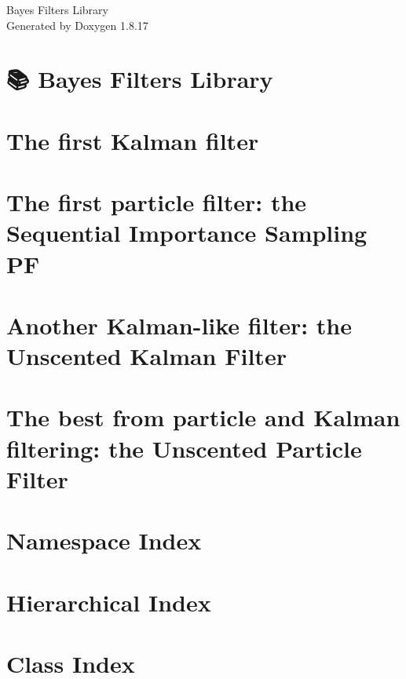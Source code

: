 \let\mypdfximage\pdfximage\def\pdfximage{\immediate\mypdfximage}\documentclass[twoside]{book}
\newcommand{\+}{\discretionary{\mbox{\scriptsize$\hookleftarrow$}}{}{}}
\newcommand{\clearemptydoublepage}{%
  \newpage{\pagestyle{empty}\cleardoublepage}%
}
\begin{document}
\hypersetup{pageanchor=false,
             bookmarksnumbered=true,
             pdfencoding=unicode
            }
\begin{titlepage}
\vspace*{7cm}
\begin{center}%
{\Large Bayes Filters Library }\\
\vspace*{1cm}
{\large Generated by Doxygen 1.8.17}\\
\end{center}
\end{titlepage}
\clearemptydoublepage
{}
\tableofcontents
\clearemptydoublepage
{}
\hypersetup{pageanchor=true}

\chapter{📚 Bayes Filters Library}
\label{index}\hypertarget{index}{}
\chapter{The first Kalman filter}
\label{kf}

\chapter{The first particle filter\+: the Sequential Importance Sampling PF}
\label{sis}

\chapter{Another Kalman-\/like filter\+: the Unscented Kalman Filter}
\label{ukf}

\chapter{The best from particle and Kalman filtering\+: the Unscented Particle Filter}
\label{upf}

\chapter{Namespace Index}

\chapter{Hierarchical Index}

\chapter{Class Index}

\end{document}
